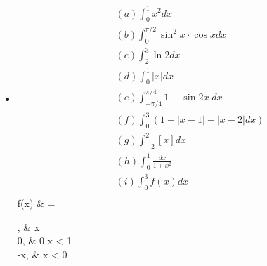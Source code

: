 \documentclass{article}
\begin{document}
\begin{itemize}
    \item[\text{*}] 
    \begin{align*}
        & (a) \int_0^1 x^2 dx \\
        & (b) \int_{0}^{\pi/2} \sin^2 x \cdot \cos x dx \\
        & (c) \int_2^3 \ln 2 dx \\
        & (d) \int_0^1 |x| dx \\
        & (e) \int_{-\pi/4}^{\pi/4} 1 - \sin 2x \; dx \\
        & (f) \int_0^3 (1 - |x - 1| + |x - 2| dx) \\
        & (g) \int_{-2}^2 [x] dx \\
        & (h) \int_0^1 \frac{dx}{1 + x^2} \\
        & (i) \int_0^3 f(x) dx \\
\end{align*}
    f(x) & = 
	  \begin{cases}
		  [x], &  x  \\
		  0, &  0 \leq x < 1 \\
		  -x, &  x < 0
	  \end{cases}
\end{itemize}
\end{document}
